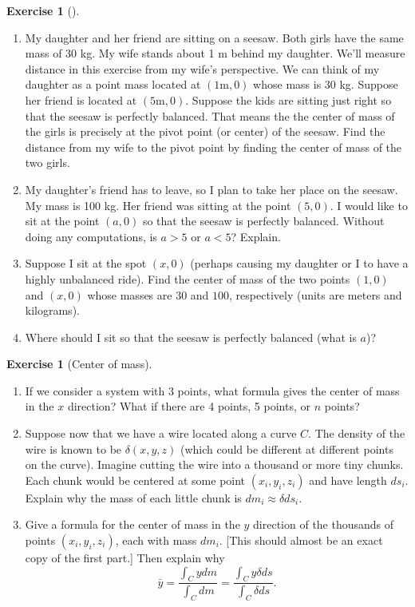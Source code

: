 \documentclass[10pt,]{book}
\theoremstyle{plain}
\theoremstyle{definition}
\theoremstyle{definition}
\theoremstyle{definition}
\theoremstyle{definition}
\newtheorem{exploration}[project]{Exercise}
\theoremstyle{definition}
\numberwithin{equation}{section}
\newcommand{\lt}{<}
\begin{document}
\begin{exploration}[]\label{exploration-220}
\leavevmode%
\begin{enumerate}[font=\bfseries,label=(\alph*),ref=\alph*]
\item\label{task-570} My daughter and her friend are sitting on a seesaw.  Both girls have the same mass of 30 kg. My wife stands about 1 m behind my daughter. We'll measure distance in this exercise from my wife's perspective.  We can think of my daughter as a point mass located at \((1\text{m} ,0)\) whose mass is \(30\) kg. Suppose her friend is located at \((5\text{m} ,0)\). Suppose the kids are sitting just right so that the seesaw is perfectly balanced.  That means the the center of mass of the girls is precisely at the pivot point (or center) of the seesaw. Find the distance from my wife to the pivot point by finding the center of mass of the two girls.%
\item\label{task-571} My daughter's friend has to leave, so I plan to take her place on the seesaw. My mass is 100 kg. Her friend was sitting at the point \((5,0)\). I would like to sit at the point \((a,0)\) so that the seesaw is perfectly balanced. Without doing any computations, is \(a>5\) or \(a\lt 5\)? Explain.%
\item\label{task-572} Suppose I sit at the spot \((x,0)\) (perhaps causing my daughter or I to have a highly unbalanced ride). Find the center of mass of the two points \((1,0)\) and \((x,0)\) whose masses are \(30\) and \(100\), respectively (units are meters and kilograms).%
\item\label{task-573} Where should I sit so that the seesaw is perfectly balanced (what is \(a\))?%
\end{enumerate}
\end{exploration}
\begin{exploration}[Center of mass]\label{center_of_mass_of_curve}
\leavevmode%
\begin{enumerate}[font=\bfseries,label=(\alph*),ref=\alph*]
\item\label{task-574} If we consider a system with 3 points, what formula gives the center of mass in the \(x\) direction? What if there are 4 points, 5 points, or \(n\) points?%
\item\label{task-575} Suppose now that we have a wire located along a curve \(C\). The density of the wire is known to be \(\delta(x,y,z)\) (which could be different at different points on the curve).  Imagine cutting the wire into a thousand or more tiny chunks.  Each chunk would be centered at some point \((x_i,y_i,z_i)\) and have length \(ds_i\). Explain why the mass of each little chunk is \(dm_i\approx\delta ds_i\).%
\item\label{task-576} Give a formula for the center of mass in the \(y\) direction of the thousands of points \((x_i,y_i,z_i)\), each with mass \(dm_i\). [This should almost be an exact copy of the first part.] Then explain why%
\begin{equation*}
\bar y = \frac{\int_C y dm}{\int_C dm}=\frac{\int_C y \delta ds}{\int_C \delta ds}.
\end{equation*}
%
\end{enumerate}
\end{exploration}
\end{document}
